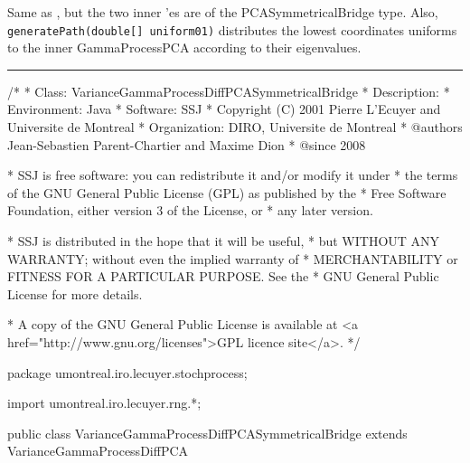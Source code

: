 
Same as , but the two
inner 'es are of the PCASymmetricalBridge type.
Also, \texttt{generatePath(double[] uniform01)} distributes the
lowest coordinates uniforms to the inner
GammaProcessPCA according to their eigenvalues.

\bigskip\hrule\bigskip

\begin{code}
\begin{hide}
/*
 * Class:        VarianceGammaProcessDiffPCASymmetricalBridge
 * Description:
 * Environment:  Java
 * Software:     SSJ
 * Copyright (C) 2001  Pierre L'Ecuyer and Universite de Montreal
 * Organization: DIRO, Universite de Montreal
 * @authors      Jean-Sebastien Parent-Chartier and Maxime Dion
 * @since        2008

 * SSJ is free software: you can redistribute it and/or modify it under
 * the terms of the GNU General Public License (GPL) as published by the
 * Free Software Foundation, either version 3 of the License, or
 * any later version.

 * SSJ is distributed in the hope that it will be useful,
 * but WITHOUT ANY WARRANTY; without even the implied warranty of
 * MERCHANTABILITY or FITNESS FOR A PARTICULAR PURPOSE.  See the
 * GNU General Public License for more details.

 * A copy of the GNU General Public License is available at
   <a href="http://www.gnu.org/licenses">GPL licence site</a>.
 */
\end{hide}
package umontreal.iro.lecuyer.stochprocess;\begin{hide}
import umontreal.iro.lecuyer.rng.*;

\end{hide}

public class VarianceGammaProcessDiffPCASymmetricalBridge extends
             VarianceGammaProcessDiffPCA \begin{hide} {



\end{hide}
\end{code}
